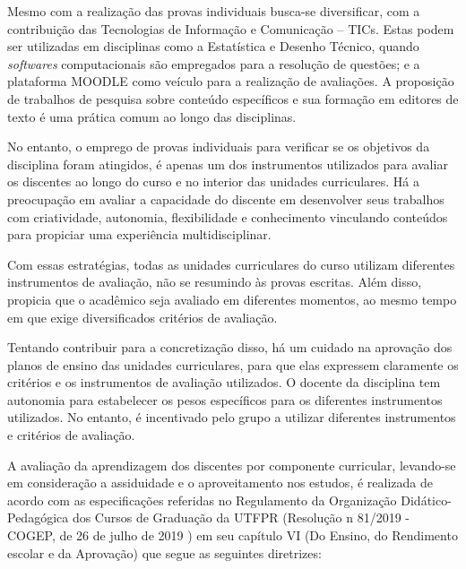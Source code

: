 Mesmo com a realização das provas individuais busca-se diversificar, com a contribuição das Tecnologias de Informação e Comunicação – TICs. Estas podem ser utilizadas em disciplinas como a Estatística e Desenho Técnico, quando \textit{softwares} computacionais são empregados para a resolução de questões; e a plataforma MOODLE como veículo para a realização de avaliações. A proposição de trabalhos de pesquisa sobre conteúdo específicos e sua formação em editores de texto é uma prática comum ao longo das disciplinas.

No entanto, o emprego de provas individuais para verificar se os objetivos da disciplina foram atingidos, é apenas um dos instrumentos utilizados para avaliar os discentes ao longo do curso e no interior das unidades curriculares. Há a preocupação em avaliar a capacidade do discente em desenvolver seus trabalhos com criatividade, autonomia, flexibilidade e conhecimento vinculando conteúdos para propiciar uma experiência multidisciplinar. 

Com essas estratégias, todas as unidades curriculares do curso utilizam diferentes instrumentos de avaliação, não se resumindo às provas escritas. Além disso, propicia que o acadêmico seja avaliado em diferentes momentos, ao mesmo tempo em que exige diversificados critérios de avaliação. 

Tentando contribuir para a concretização disso, há um cuidado na aprovação dos planos de ensino das unidades curriculares, para que elas expressem claramente os critérios e os instrumentos de avaliação utilizados. O docente da disciplina tem autonomia para estabelecer os pesos específicos para os diferentes instrumentos utilizados. No entanto, é incentivado pelo grupo a utilizar diferentes instrumentos e critérios de avaliação. 

A avaliação da aprendizagem dos discentes por componente curricular, levando-se em consideração a assiduidade e o aproveitamento nos estudos, é realizada de acordo com as especificações referidas no Regulamento da Organização Didático-Pedagógica dos Cursos de Graduação da UTFPR (Resolução n\textordmasculine{} 81/2019 - COGEP, de 26 de julho de 2019 \cite{rodp}) em seu capítulo VI (Do Ensino, do Rendimento escolar e da Aprovação) que segue as seguintes diretrizes: 

